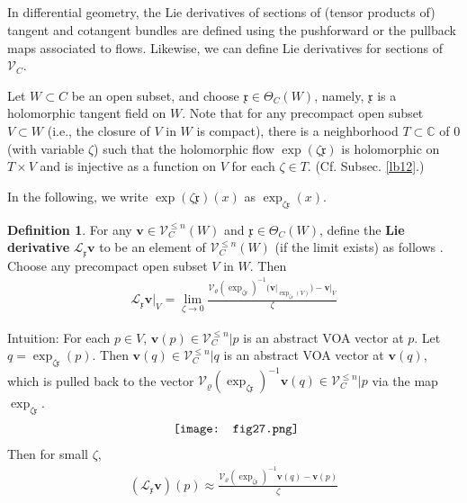 \documentclass[11pt,b5paper,notitlepage]{article}
\theoremstyle{definition}
\newtheorem{df}{Definition}[section]
\theoremstyle{plain}
\newcommand{\fk}{\mathfrak}
\newcommand{\mc}{\mathcal}
\newcommand{\scr}{\mathscr}
\newcommand{\xk}{\mathfrak x}
\newcommand{\Cbb}{\mathbb C}
\newcommand{\vbf}{\mathbf v}
\numberwithin{equation}{section}
\begin{document}
\subsection{}

In differential geometry, the Lie derivatives of sections of (tensor products of) tangent and cotangent bundles are defined using the pushforward or the pullback maps associated to flows. Likewise, we can define Lie derivatives for sections of $\scr V_C$. 


Let $W\subset C$ be an open subset, and choose $\fk x\in\Theta_C(W)$, namely, $\xk$ is a holomorphic tangent field on $W$. Note that for any precompact open subset $V\subset W$ (i.e., the closure of $V$ in $W$ is compact), there is a neighborhood $T\subset\Cbb$ of $0$ (with variable $\zeta$) such that the holomorphic flow $\exp(\zeta \fk x)$ is holomorphic on $T\times V$ and is injective as a function on $V$ for each $\zeta\in T$. (Cf. Subsec. \ref{lb12}.)



In the following, we write $\exp(\zeta\xk)(x)$ as $\exp_{\zeta\xk}(x)$.

\begin{df}\label{lb129}
For any $\vbf\in\scr V_C^{\leq n}(W)$ and $\xk\in\Theta_C(W)$, define the \textbf{Lie derivative} $\mc L_\xk\vbf$  \index{L@$\mc L_\xk$, the Lie derivative} to be an element of $\scr V_C^{\leq n}(W)$ (if the limit exists) as follows . Choose any precompact open subset $V$ in $W$. Then
\begin{align}\label{eq207}
\mc L_\xk\vbf\big|_V=\lim_{\zeta\rightarrow0} \frac{\mc V_\varrho(\exp_{\zeta\xk})^{-1}\big(\vbf\big|_{\exp_{\zeta\xk}(V)}\big)-\vbf\big|_V}{\zeta}
\end{align}
\end{df}


Intuition: For each $p\in V$, $\vbf(p)\in\scr V_C^{\leq n}|p$ is an abstract VOA vector at $p$. Let $q=\exp_{\zeta\xk}(p)$. Then  $\vbf(q)\in\scr V_C^{\leq n}|q$ is an abstract VOA vector at $\vbf(q)$,  which is pulled back to the vector $\mc V_\varrho(\exp_{\zeta\xk})^{-1}\vbf(q)\in\scr V_C^{\leq n}|p$ via the map $\exp_{\zeta\xk}$.
\begin{align}\label{eq202}
\vcenter{\hbox{{
\texttt{[image: fig27.png]}}}}
\end{align}
Then for small $\zeta$,
\begin{align}
(\mc L_\xk\vbf)(p)\approx \frac{\mc V_\varrho(\exp_{\zeta\xk})^{-1}\vbf(q)-\vbf(p)}{\zeta}
\end{align}
\end{document}
